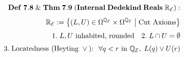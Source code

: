 \documentclass[preview]{standalone}
\begin{document}
\begin{align*}
\special{dvisvgm:raw <g id='unique000'>}\mathbf{Def\;7.8\;\&\;Thm\;7.9\;(Internal\;Dedekind\;Reals\;\mathbb{R}_{\mathcal{E}}):}\\[4pt]\mathbb{R}_{\mathcal{E}} := \left\{(L, U) \in \Omega^{\mathbb{Q}_{\mathcal{E}}}\times\Omega^{\mathbb{Q}_{\mathcal{E}}} \;\middle|\; \text{Cut Axioms}\right\}\\[4pt]1.\;L, U\text{ inhabited, rounded}\quad 2.\;L \cap U = \emptyset\\[3pt]3.\;\text{Locatedness (Heyting }\vee\text{): }\;\forall q < r\text{ in }\mathbb{Q}_{\mathcal{E}},\; L(q)\vee U(r)\special{dvisvgm:raw </g>}
\end{align*}
\end{document}
